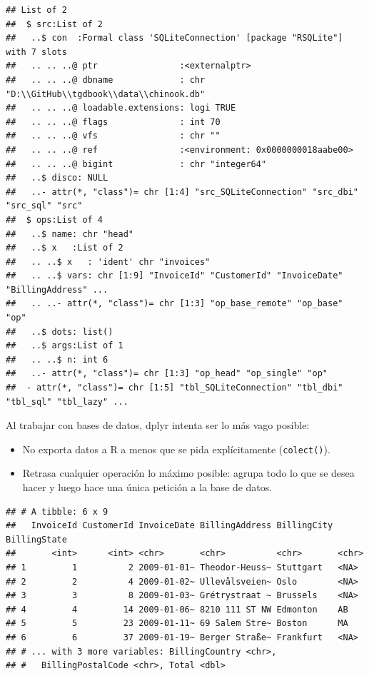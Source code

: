 \documentclass[]{book}
\newenvironment{Shaded}{\begin{snugshade}}{\end{snugshade}}
\newcommand{\StringTok}[1]{\textcolor[rgb]{0.31,0.60,0.02}{#1}}
\newcommand{\OperatorTok}[1]{\textcolor[rgb]{0.81,0.36,0.00}{\textbf{#1}}}
\newcommand{\NormalTok}[1]{#1}
\begin{document}
\begin{verbatim}
## List of 2
##  $ src:List of 2
##   ..$ con  :Formal class 'SQLiteConnection' [package "RSQLite"] with 7 slots
##   .. .. ..@ ptr                :<externalptr> 
##   .. .. ..@ dbname             : chr "D:\\GitHub\\tgdbook\\data\\chinook.db"
##   .. .. ..@ loadable.extensions: logi TRUE
##   .. .. ..@ flags              : int 70
##   .. .. ..@ vfs                : chr ""
##   .. .. ..@ ref                :<environment: 0x0000000018aabe00> 
##   .. .. ..@ bigint             : chr "integer64"
##   ..$ disco: NULL
##   ..- attr(*, "class")= chr [1:4] "src_SQLiteConnection" "src_dbi" "src_sql" "src"
##  $ ops:List of 4
##   ..$ name: chr "head"
##   ..$ x   :List of 2
##   .. ..$ x   : 'ident' chr "invoices"
##   .. ..$ vars: chr [1:9] "InvoiceId" "CustomerId" "InvoiceDate" "BillingAddress" ...
##   .. ..- attr(*, "class")= chr [1:3] "op_base_remote" "op_base" "op"
##   ..$ dots: list()
##   ..$ args:List of 1
##   .. ..$ n: int 6
##   ..- attr(*, "class")= chr [1:3] "op_head" "op_single" "op"
##  - attr(*, "class")= chr [1:5] "tbl_SQLiteConnection" "tbl_dbi" "tbl_sql" "tbl_lazy" ...
\end{verbatim}

Al trabajar con bases de datos, dplyr intenta ser lo más vago posible:

\begin{itemize}
\item
  No exporta datos a R a menos que se pida explícitamente
  (\texttt{colect()}).
\item
  Retrasa cualquier operación lo máximo posible: agrupa todo lo que se
  desea hacer y luego hace una única petición a la base de datos.
\end{itemize}

\begin{Shaded}
\end{Shaded}

\begin{verbatim}
## # A tibble: 6 x 9
##   InvoiceId CustomerId InvoiceDate BillingAddress BillingCity BillingState
##       <int>      <int> <chr>       <chr>          <chr>       <chr>       
## 1         1          2 2009-01-01~ Theodor-Heuss~ Stuttgart   <NA>        
## 2         2          4 2009-01-02~ Ullevålsveien~ Oslo        <NA>        
## 3         3          8 2009-01-03~ Grétrystraat ~ Brussels    <NA>        
## 4         4         14 2009-01-06~ 8210 111 ST NW Edmonton    AB          
## 5         5         23 2009-01-11~ 69 Salem Stre~ Boston      MA          
## 6         6         37 2009-01-19~ Berger Straße~ Frankfurt   <NA>        
## # ... with 3 more variables: BillingCountry <chr>,
## #   BillingPostalCode <chr>, Total <dbl>
\end{verbatim}
\end{document}
